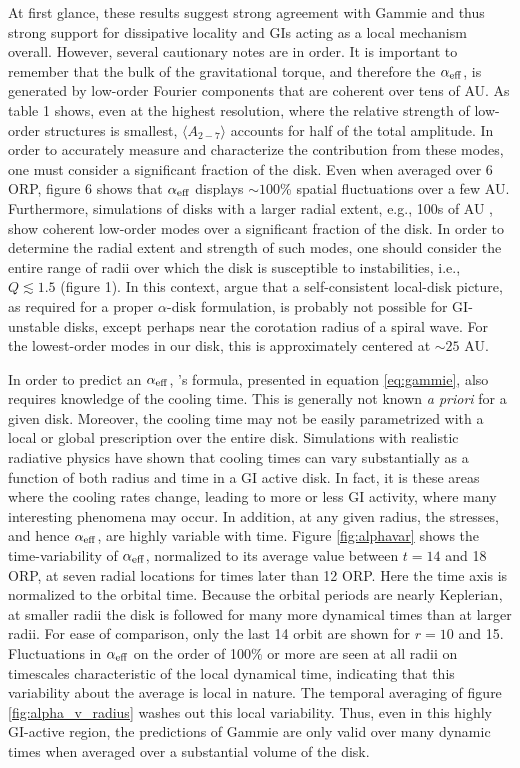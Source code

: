 \documentclass[manuscript]{aastex}
\begin{document}
At first glance, these results suggest strong agreement with Gammie and thus strong support for dissipative
locality and GIs acting as a local mechanism overall.  However, several cautionary notes are in order. It is important to remember that the bulk of the gravitational torque, and therefore the $\alpha_{\rm{eff}}$, is generated by low-order 
Fourier components that are coherent over tens of AU.  As table 1 shows, even at the highest resolution, where
the relative strength of low-order structures is smallest, $\langle A_{2-7} \rangle$ accounts for half of the total amplitude.
In order to accurately measure and characterize the contribution from these modes, one must consider a significant fraction of the disk. Even when averaged over 6 ORP, figure 6 shows that $\alpha_{\rm{eff}}$ displays $\sim 100$\% spatial fluctuations
over a few AU.
Furthermore, simulations of disks with a larger radial extent, e.g., 100s of AU \citep{boley2009}, show coherent 
low-order modes over a significant fraction of the disk. 
In order to determine the radial extent and strength of such modes, one should consider the entire range of radii over which the disk is susceptible to instabilities, i.e., $Q \lesssim 1.5$ (figure 1).  In this context,
\cite{balbus1999}
argue that a self-consistent local-disk picture, as required for a proper $\alpha$-disk formulation,
is probably not possible for GI-unstable disks,
except perhaps near the corotation radius of a spiral wave.
For the lowest-order modes in our disk, this is approximately centered at $\sim 25$ AU.

In order to predict an $\alpha_{\rm{eff}}$, \citeauthor{gammie2001}'s formula, presented in equation \eqref{eq:gammie}, also requires knowledge of the cooling time. This is generally not known {\it a priori} for a given disk. Moreover, the cooling time may not be easily parametrized with a local or global prescription over the entire disk. Simulations with realistic radiative physics \citep{boley2006} have shown that cooling times can vary substantially as a function of both radius and time in a GI active disk. In fact, it is these areas where the cooling rates change, leading to more or less GI activity, where many interesting phenomena may occur.
In addition, at any given radius, the
stresses, and hence $\alpha_{\rm{eff}}$, are highly variable with time.
Figure \ref{fig:alphavar} shows the time-variability of $\alpha_{\rm{eff}}$, 
normalized to its average value between $t = 14$ and 18 ORP, at seven radial locations
for times later than 12 ORP.
Here the time axis is normalized to the orbital time.  Because the orbital periods are nearly
Keplerian, at smaller radii the disk is followed for many more dynamical times than at larger
radii.  For ease of comparison, 
only the last 14 orbit are shown for $r = 10$ and 15.
Fluctuations in $\alpha_{\rm{eff}}$
on the order of 100\% or more are seen at all radii
on  timescales characteristic of the local dynamical time, indicating that
this variability about the average is local in nature.  The temporal averaging
of figure \ref{fig:alpha_v_radius} washes out this local variability.
Thus,
even in this highly GI-active region, the predictions of Gammie are only valid over many dynamic times 
when averaged over a substantial volume of the disk. 
\end{document}
